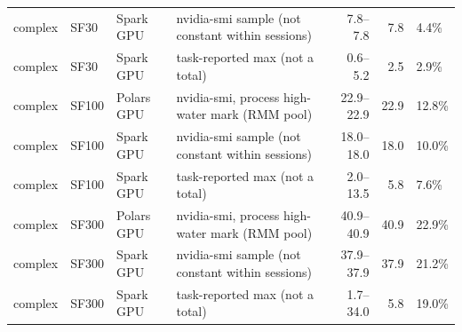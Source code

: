 \begin{tabular}{llllrrl}
complex & SF30 & Spark GPU & nvidia-smi sample (not constant within sessions) & 7.8--7.8 & 7.8 & 4.4\% \\
complex & SF30 & Spark GPU & task-reported max (not a total) & 0.6--5.2 & 2.5 & 2.9\% \\
complex & SF100 & Polars GPU & nvidia-smi, process high-water mark (RMM pool) & 22.9--22.9 & 22.9 & 12.8\% \\
complex & SF100 & Spark GPU & nvidia-smi sample (not constant within sessions) & 18.0--18.0 & 18.0 & 10.0\% \\
complex & SF100 & Spark GPU & task-reported max (not a total) & 2.0--13.5 & 5.8 & 7.6\% \\
complex & SF300 & Polars GPU & nvidia-smi, process high-water mark (RMM pool) & 40.9--40.9 & 40.9 & 22.9\% \\
complex & SF300 & Spark GPU & nvidia-smi sample (not constant within sessions) & 37.9--37.9 & 37.9 & 21.2\% \\
complex & SF300 & Spark GPU & task-reported max (not a total) & 1.7--34.0 & 5.8 & 19.0\% \\
\bottomrule
\end{tabular}
